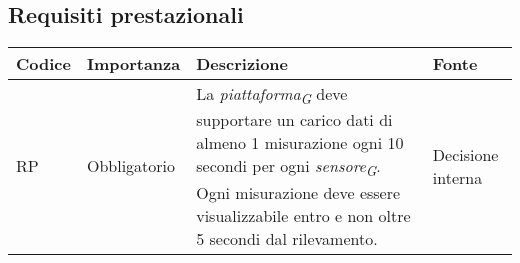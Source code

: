 \subsection{Requisiti prestazionali}
\setcounter{rowcounter}{0}
\begin{longtable}{|C{1.5cm}|C{2cm}|L{5cm}|C{2cm}|}
    \hline
    \textbf{Codice} & \textbf{Importanza} & \textbf{Descrizione} & \textbf{Fonte}  \\

    \hline
     RP & Obbligatorio & La \textit{piattaforma}\textsubscript{\textit{G}} deve supportare un carico dati di almeno 1 misurazione ogni 10 secondi per ogni \textit{sensore}\textsubscript{\textit{G}}. Ogni misurazione deve essere visualizzabile entro e non oltre 5 secondi dal rilevamento. & Decisione interna \\
   
    \hline
\end{longtable}
